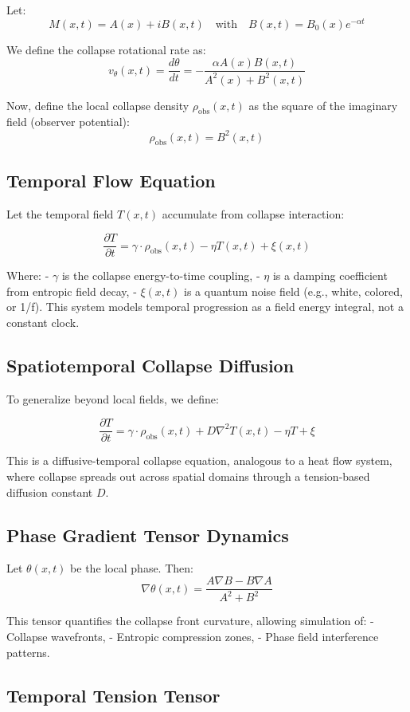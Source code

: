 Let:
\[
M(x, t) = A(x) + i B(x, t)
\quad \text{with} \quad
B(x, t) = B_0(x) e^{-\alpha t}
\]

We define the  collapse rotational rate  as:
\[
v_\theta(x, t) = \frac{d\theta}{dt} = -\frac{\alpha A(x) B(x, t)}{A^2(x) + B^2(x, t)}
\]

Now, define the  local collapse density  $\rho_{\text{obs}}(x, t)$ as the square of the imaginary field (observer potential):
\[
\rho_{\text{obs}}(x, t) = B^2(x, t)
\]

\subsection*{Temporal Flow Equation}

Let the temporal field $T(x,t)$ accumulate from collapse interaction:

\[
\frac{\partial T}{\partial t} = \gamma \cdot \rho_{\text{obs}}(x, t) - \eta T(x, t) + \xi(x, t)
\]

Where:
- $\gamma$ is the collapse energy-to-time coupling,
- $\eta$ is a damping coefficient from entropic field decay,
- $\xi(x,t)$ is a quantum noise field (e.g., white, colored, or 1/f). \cite{chapter_time} This system models temporal progression as a field energy integral, not a constant clock. \cite{chapter_time} \subsection*{Spatiotemporal Collapse Diffusion}

To generalize beyond local fields, we define:

\[
\frac{\partial T}{\partial t} = \gamma \cdot \rho_{\text{obs}}(x, t) + D \nabla^2 T(x, t) - \eta T + \xi
\]

This is a diffusive-temporal collapse equation, analogous to a heat flow system, where collapse spreads out across spatial domains through a tension-based diffusion constant $D$. \cite{chapter_time} \subsection*{Phase Gradient Tensor Dynamics}

Let $\theta(x,t)$ be the local phase. \cite{chapter_time} Then:
\[
\nabla \theta(x,t) = \frac{A \nabla B - B \nabla A}{A^2 + B^2}
\]

This tensor quantifies the collapse front curvature, allowing simulation of:
- Collapse wavefronts,
- Entropic compression zones,
- Phase field interference patterns. \cite{chapter_time} \subsection*{Temporal Tension Tensor}

